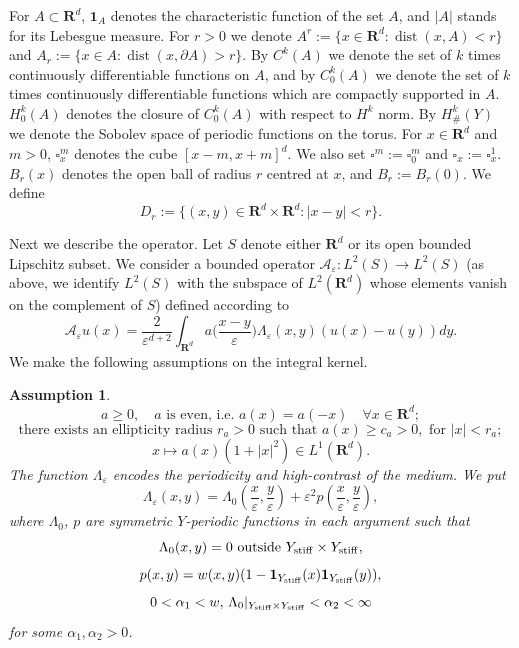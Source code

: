 \documentclass[11pt]{article}
\newcommand\e {\varepsilon}
\newcommand\stiff{{\rm stiff}}
\def\RR{\R}
\newcommand{\R}{\mathbf{R}}
\def\AA{\mathcal{A}}
\newcommand\dist{\operatorname{dist}}
\newtheorem{assumption}[theorem]{Assumption}
\theoremstyle{remark}
\begin{document}
For $A \subset \RR^d$, $\mathbf{1}_A$ denotes the characteristic function of the set $A$, and $|A|$ stands for its Lebesgue measure. For $r>0$ we denote $A^r:= \{x\in \R^d: \dist(x,A) < r\}$ and $A_r:= \{x\in A: \dist(x,\partial A) > r\}$.
By
$C^k(A)$ we denote the set of $k$ times continuously differentiable functions on $A$, and  by $C_0^k(A)$ we denote the set of $k$ times continuously differentiable functions which are compactly supported in $A$. $H_0^k(A)$ denotes the closure of $C_0^k(A)$ with respect to $H^k$ norm.
By
${H}^k_\#(Y)$ we denote the Sobolev space of periodic functions on the torus.
  For $x \in \RR^d$ and $m>0$, $\square_x^m$ denotes the cube $[x-m,x+m]^d$. We also set $\square^m:=\square_0^m $ and $\square_x:=\square_x^1 $. $B_r(x)$ denotes the open ball of radius $r$ centred at $x$, and $B_r:=B_r(0)$. We define
$$D_r:=\{(x,y) \in \R^d \times \R^d: |x-y|<r\}.   $$

Next we describe the operator. Let  $S$  denote  either $\RR^d$ or its open bounded Lipschitz subset. We consider a bounded   operator  $\AA_\e : L^2(S) \to L^2(S) $ (as above, we identify $L^2(S)$ with the subspace of $L^2(\R^d)$ whose elements vanish on the complement of $S$) defined according to
$$
\AA_\e u(x)= \frac{2}{\e^{d+2}} \int_{\mathbf{R}^d}a \Big(\frac{x-y }\e \Big)
\Lambda_\e  (x,y ) (u(x)-u(y ))dy.
$$
We make the following assumptions on the integral kernel.
\begin{assumption}
\begin{equation*}%
	a \geq 0, \quad a \mbox{ is even, i.e. } a(x)=a(-x) \quad \forall x \in \mathbf{R}^d;
\end{equation*}
\begin{equation}\label{a-2}%
	\mbox{there exists an ellipticity radius } r_a > 0 \mbox{ such that }	a(x) \geq c_a>0, \mbox{ for } |x|<r_a;
\end{equation}
\begin{equation*}%
	x\mapsto a(x)(1+|x|^2) \in L^1(\R^d).
\end{equation*}
The function $\Lambda_\e$ encodes the periodicity and high-contrast of the medium. We put
$$\Lambda_\e (x,y )=\Lambda_0 \left(\frac{x}\e ,\frac{y }\e  \right)+\e^2p\left(\frac{x}\e , \frac{y }\e  \right), $$
where $\Lambda_0$, $p$ are symmetric $Y$-periodic functions in each argument such that
\begin{equation*} %
	\Lambda_0(x,y)=0 \textrm{ outside } Y_\stiff \times Y_\stiff,  
\end{equation*}
\begin{equation*} %
	p(x,y)= w(x,y) (1-\mathbf{1}_{Y_\stiff}(x)\mathbf{1}_{Y_\stiff}(y)),  
	 \end{equation*}
\begin{equation*} %
	0<\alpha_1<w,\,\Lambda_0\vert_{Y_\stiff \times Y_\stiff}<\alpha_2<\infty
\end{equation*}
for some $\alpha_1,\alpha_2>0$.
\end{assumption}
\end{document}
